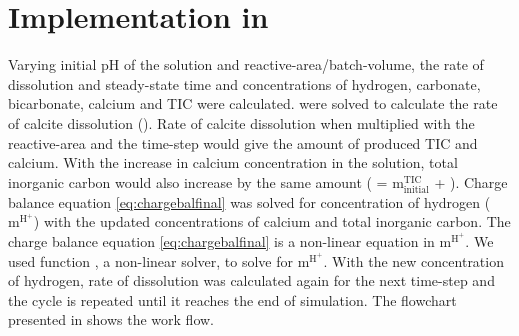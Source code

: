 \section{Implementation in \MATLAB}
Varying initial pH of the solution and reactive-area/batch-volume, the rate of dissolution and steady-state time and 
concentrations of hydrogen, carbonate, bicarbonate, calcium and TIC were calculated.  were solved 
to calculate the rate of calcite dissolution (). Rate of calcite dissolution when multiplied with the reactive-area 
and the time-step would give the amount of produced TIC and calcium. With the increase in calcium concentration in the 
solution, total inorganic carbon would also increase by the same amount ( = $\mathrm{m_{initial}^{TIC}}$ + ). 
Charge balance equation \ref{eq:chargebalfinal} was solved for concentration of hydrogen ($\mathrm{m^{H^{+}}}$) with the updated concentrations 
of calcium and total inorganic carbon. The charge balance equation \ref{eq:chargebalfinal} is a non-linear equation in $\mathrm{m^{H^+}}$. 
We used \MATLAB function , a non-linear solver, to solve  for $\mathrm{m^{H^+}}$. With the new 
concentration of hydrogen, rate of dissolution was calculated again for the next time-step and the cycle is repeated until it 
reaches the end of simulation. The flowchart presented in  shows the work flow. 

